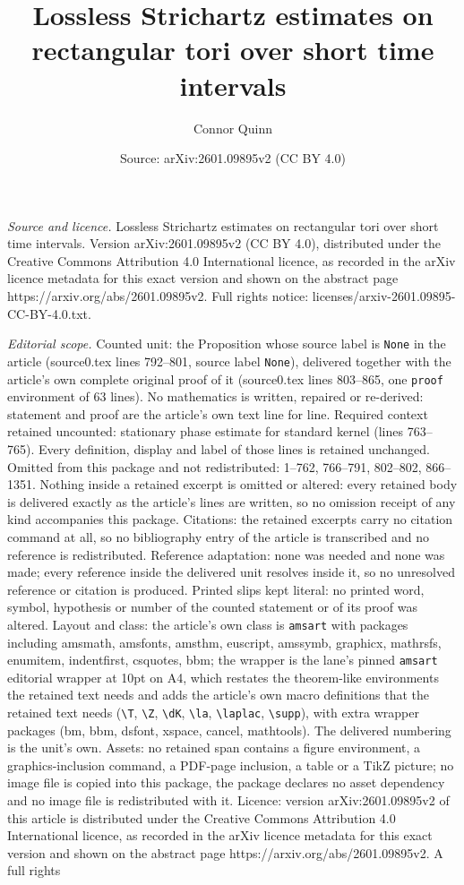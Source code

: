 \documentclass[10pt,a4paper]{amsart}
\title[Lossless Strichartz estimates on rectangular tori over short]{Lossless Strichartz estimates on rectangular tori over short time intervals}
\author{Connor Quinn}
\date{Source: arXiv:2601.09895v2 (CC BY 4.0)}
\begin{document}
\maketitle

\noindent\emph{Source and licence.} Lossless Strichartz estimates on rectangular tori over short time intervals. Version arXiv:2601.09895v2 (CC BY 4.0), distributed under the Creative Commons Attribution 4.0 International licence, as recorded in the arXiv licence metadata for this exact version and shown on the abstract page https://arxiv.org/abs/2601.09895v2. Full rights notice: licenses/arxiv-2601.09895-CC-BY-4.0.txt.\par\smallskip

\noindent\textit{Editorial scope.} Counted unit: the Proposition whose source label is \texttt{None} in the article (source0.tex lines 792--801, source label \texttt{None}), delivered together with the article's own complete original proof of it (source0.tex lines 803--865, one \texttt{proof} environment of 63 lines). No mathematics is written, repaired or re-derived: statement and proof are the article's own text line for line. Required context retained uncounted: stationary phase estimate for standard kernel (lines 763--765). Every definition, display and label of those lines is retained unchanged. Omitted from this package and not redistributed: 1--762, 766--791, 802--802, 866--1351. Nothing inside a retained excerpt is omitted or altered: every retained body is delivered exactly as the article's lines are written, so no omission receipt of any kind accompanies this package. Citations: the retained excerpts carry no citation command at all, so no bibliography entry of the article is transcribed and no reference is redistributed. Reference adaptation: none was needed and none was made; every reference inside the delivered unit resolves inside it, so no unresolved reference or citation is produced. Printed slips kept literal: no printed word, symbol, hypothesis or number of the counted statement or of its proof was altered. Layout and class: the article's own class is \texttt{amsart} with packages including amsmath, amsfonts, amsthm, euscript, amssymb, graphicx, mathrsfs, enumitem, indentfirst, csquotes, bbm; the wrapper is the lane's pinned \texttt{amsart} editorial wrapper at 10pt on A4, which restates the theorem-like environments the retained text needs and adds the article's own macro definitions that the retained text needs (\texttt{\textbackslash T}, \texttt{\textbackslash Z}, \texttt{\textbackslash dK}, \texttt{\textbackslash la}, \texttt{\textbackslash laplac}, \texttt{\textbackslash supp}), with extra wrapper packages (bm, bbm, dsfont, xspace, cancel, mathtools). The delivered numbering is the unit's own. Assets: no retained span contains a figure environment, a graphics-inclusion command, a PDF-page inclusion, a table or a TikZ picture; no image file is copied into this package, the package declares no asset dependency and no image file is redistributed with it. Licence: version arXiv:2601.09895v2 of this article is distributed under the Creative Commons Attribution 4.0 International licence, as recorded in the arXiv licence metadata for this exact version and shown on the abstract page https://arxiv.org/abs/2601.09895v2. A full rights 
\end{document}
